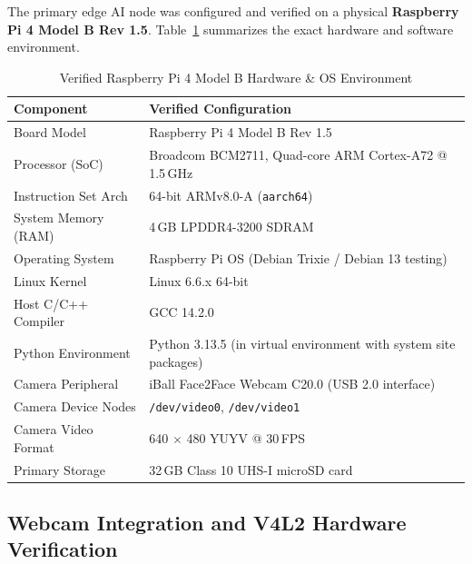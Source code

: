 \documentclass[12pt,a4paper]{article}
\begin{document}
The primary edge AI node was configured and verified on a physical \textbf{Raspberry Pi 4 Model B
Rev 1.5}. Table~\ref{tab:rpi_specs} summarizes the exact hardware and software environment.

\begin{table}[H]
\centering
\caption{Verified Raspberry Pi 4 Model B Hardware \& OS Environment}\label{tab:rpi_specs}
\begin{tabular}{ll}
\toprule
\textbf{Component} & \textbf{Verified Configuration} \\
\midrule
Board Model          & Raspberry Pi 4 Model B Rev 1.5 \\
Processor (SoC)      & Broadcom BCM2711, Quad-core ARM Cortex-A72 @ 1.5\,GHz \\
Instruction Set Arch & 64-bit ARMv8.0-A (\texttt{aarch64}) \\
System Memory (RAM)  & 4\,GB LPDDR4-3200 SDRAM \\
Operating System     & Raspberry Pi OS (Debian Trixie / Debian 13 testing) \\
Linux Kernel         & Linux 6.6.x 64-bit \\
Host C/C++ Compiler  & GCC 14.2.0 \\
Python Environment   & Python 3.13.5 (in virtual environment with system site packages) \\
Camera Peripheral    & iBall Face2Face Webcam C20.0 (USB 2.0 interface) \\
Camera Device Nodes  & \texttt{/dev/video0}, \texttt{/dev/video1} \\
Camera Video Format  & 640 $\times$ 480 YUYV @ 30\,FPS \\
Primary Storage      & 32\,GB Class 10 UHS-I microSD card \\
\bottomrule
\end{tabular}
\end{table}

\subsection{Webcam Integration and V4L2 Hardware Verification}
\end{document}
